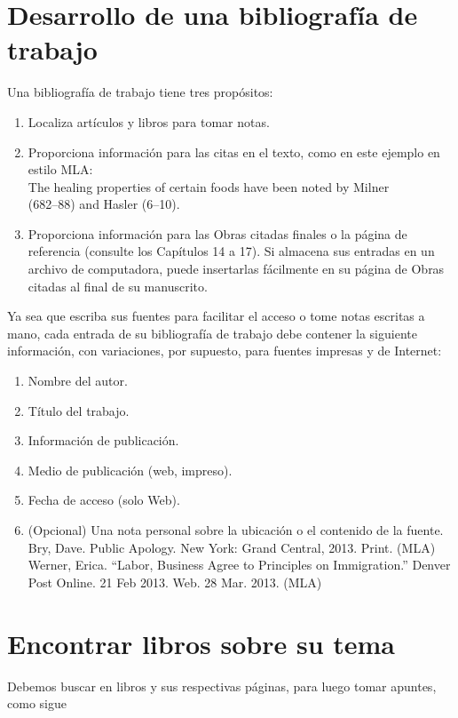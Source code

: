 \section{Desarrollo de una bibliografía de trabajo}
Una bibliografía de trabajo tiene tres propósitos:
\begin{enumerate}[1.]
    \item Localiza artículos y libros para tomar notas. 
    \item Proporciona información para las citas en el texto, como en este ejemplo en estilo MLA:\\
    The healing properties of certain foods have been noted by Milner\\
    (682–88) and Hasler (6–10).	
    \item Proporciona información para las Obras citadas finales o la página de referencia (consulte los Capítulos 14 a 17). Si almacena sus entradas en un archivo de computadora, puede insertarlas fácilmente en su página de Obras citadas al final de su manuscrito.
\end{enumerate}

Ya sea que escriba sus fuentes para facilitar el acceso o tome notas escritas a mano, cada entrada de su bibliografía de trabajo debe contener la siguiente información, con variaciones, por supuesto, para fuentes impresas y de Internet:

\begin{enumerate}[1.]
    \item Nombre del autor.
    \item Título del trabajo.
    \item Información de publicación.
    \item Medio de publicación (web, impreso).
    \item Fecha de acceso (solo Web).
    \item (Opcional) Una nota personal sobre la ubicación o el contenido de la fuente.\\

	Bry, Dave. Public Apology. New York: Grand Central, 2013. Print. (MLA)\\
	Werner, Erica. “Labor, Business Agree to Principles on Immigration.” Denver Post Online. 21 Feb 2013. Web. 28 Mar. 2013. (MLA)

\end{enumerate}


\section{Encontrar libros sobre su tema}
Debemos buscar en libros y sus respectivas páginas, para luego tomar apuntes, como sigue\\

